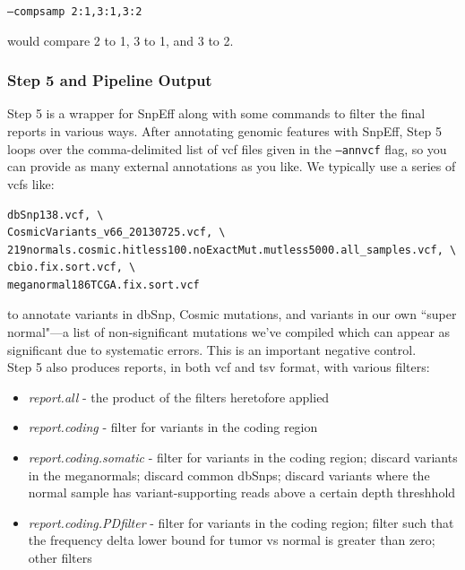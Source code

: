 \documentclass[letterpaper,14pt]{memoir}
\begin{document}
\begin{center}
\texttt{--compsamp 2:1,3:1,3:2}
\end{center}

\noindent would compare 2 to 1, 3 to 1, and 3 to 2.

\subsubsection{Step 5 and Pipeline Output}

Step 5 is a wrapper for SnpEff along with some commands to filter the final reports in various ways.
After annotating genomic features with SnpEff, Step 5 loops over the comma-delimited list of vcf files given in the \texttt{--annvcf} flag, so you can provide as many external annotations as you like.
We typically use a series of vcfs like: 

\begin{Verbatim}
dbSnp138.vcf, \
CosmicVariants_v66_20130725.vcf, \
219normals.cosmic.hitless100.noExactMut.mutless5000.all_samples.vcf, \
cbio.fix.sort.vcf, \
meganormal186TCGA.fix.sort.vcf
\end{Verbatim}

\noindent to annotate variants in dbSnp, Cosmic mutations, and variants in our own ``super normal"---a list of non-significant mutations we've compiled which can appear as significant due to systematic errors. This is an important negative control.\\

\noindent Step 5 also produces reports, in both vcf and tsv format, with various filters:

\begin{itemize}
\tightlist
\item
  \textit{report.all} - the product of the filters heretofore applied
\item
  \textit{report.coding} - filter for variants in the coding region
\item
  \textit{report.coding.somatic} - filter for variants in the coding region;
   discard variants in the meganormals;
   discard common dbSnps;
   discard variants where the normal sample has variant-supporting reads above a certain depth threshhold
\item
  \textit{report.coding.PDfilter} - filter for variants in the coding region;
   filter such that the frequency delta lower bound for tumor vs normal is greater than zero;
   other filters
\end{itemize}
\end{document}
